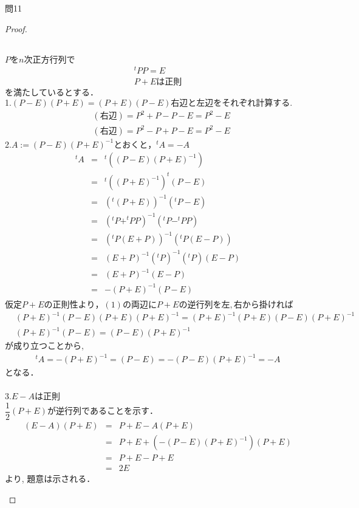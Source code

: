 \documentclass[dvipdfmx,uplatex,11pt]{jsarticle}
\begin{document}
\newpage

問11\\
\noindent
\begin{proof}
\begin{leftbar}
~\\
$Pをn次正方行列で$
\begin{eqnarray*}
^t PP=E\\
P+Eは正則
\end{eqnarray*}
$を満たしているとする．$\\
1.$(P − E)(P + E) = (P + E)(P − E)右辺と左辺をそれぞれ計算する.$
\begin{eqnarray*}
& (右辺) = P^2+P−P−E=P^2−E\\
& (右辺) = P^2−P+P−E=P^2−E
\end{eqnarray*}
2.$A := (P − E)(P + E)^{−1}とおくと，^tA=−A$
\begin{eqnarray*}
^tA&=&^t((P−E)(P+E)^{−1})\\
&=&^t((P+E)^{-1})^t(P−E)\\
&=&(^t(P+E))^{-1}(^tP−E)\\
&=&(^tP+^tPP)^{-1}(^tP−^tPP)\\
&=&(^tP(E + P))^{-1}(^tP(E − P))\\
&=&(E + P)^{−1}(^tP)^{−1}(^tP)(E − P)\\
&=&(E + P)^{−1}(E − P)\\
&=&−(P + E)^{−1}(P − E)\\
\end{eqnarray*}
$仮定P+Eの正則性より，(1)の両辺にP+Eの逆行列を左, 右から掛ければ$
\begin{eqnarray*}
& (P + E)^{-1}(P − E)(P + E)(P + E)^{−1}=(P + E)^{−1}(P + E)(P − E)(P + E)^{−1}\\
& (P + E)^{−1}(P − E)=(P − E)(P + E)^{−1}
\end{eqnarray*}
が成り立つことから,
\begin{eqnarray*}
^tA = −(P + E)^{−1}=(P − E) = −(P − E)(P + E)^{−1}= −A
\end{eqnarray*}
となる．\\
\\
3.$E − A は正則$\\
$\dfrac{1}{2}(P + E) が逆行列であることを示す．$
\begin{eqnarray*}
(E−A)(P+E)&=&P+E−A(P+E)\\
&=&P+E+(−(P − E)(P + E)^{−1})(P + E)\\
&=&P+E−P+E \\
&=&2E
\end{eqnarray*}
より, 題意は示される．
\end{leftbar}

\end{proof}
\end{document}
